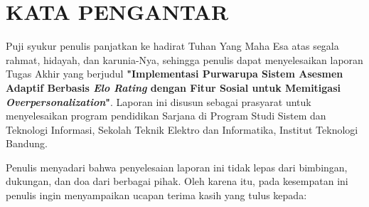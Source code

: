 \chapter*{KATA PENGANTAR}

Puji syukur penulis panjatkan ke hadirat Tuhan Yang Maha Esa atas segala rahmat, hidayah, dan karunia-Nya, sehingga penulis dapat menyelesaikan laporan Tugas Akhir yang berjudul \textbf{"Implementasi Purwarupa Sistem Asesmen Adaptif Berbasis \textit{Elo Rating} dengan Fitur Sosial untuk  Memitigasi \textit{Overpersonalization}"}. Laporan ini disusun sebagai prasyarat untuk menyelesaikan program pendidikan Sarjana di Program Studi Sistem dan Teknologi Informasi, Sekolah Teknik Elektro dan Informatika, Institut Teknologi Bandung.

Penulis menyadari bahwa penyelesaian laporan ini tidak lepas dari bimbingan, dukungan, dan doa dari berbagai pihak. Oleh karena itu, pada kesempatan ini penulis ingin menyampaikan ucapan terima kasih yang tulus kepada:

